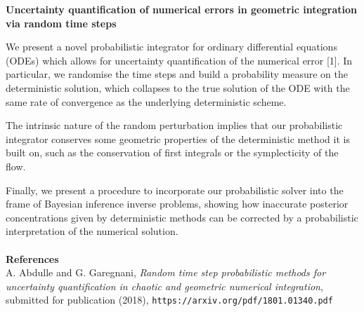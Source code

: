 \documentclass{report}
\begin{document}
	
	\noindent \textbf{Uncertainty quantification of numerical errors in geometric integration via random time steps}
	
	We present a novel probabilistic integrator for ordinary differential equations (ODEs) which allows for uncertainty quantification of the numerical error [1]. In particular, we randomise the time steps and build a probability measure on the deterministic solution, which collapses to the true solution of the ODE with the same rate of convergence as the underlying deterministic scheme.
	
	The intrinsic nature of the random perturbation implies that our probabilistic integrator conserves some geometric properties of the deterministic method it is built on, such as the conservation of first integrals or the symplecticity of the flow. 
	
	Finally, we present a procedure to incorporate our probabilistic solver into the frame of Bayesian inference inverse problems, showing how inaccurate posterior concentrations given by deterministic methods can be corrected by a probabilistic interpretation of the numerical solution.	\\ 
	\vspace{0.3cm}\\
	\noindent \textbf{References}\\
	\noindent [1] A. Abdulle and G. Garegnani, \textit{Random time step probabilistic methods for uncertainty quantification in chaotic and geometric numerical integration}, submitted for publication (2018), \texttt{https://arxiv.org/pdf/1801.01340.pdf}
\end{document}
